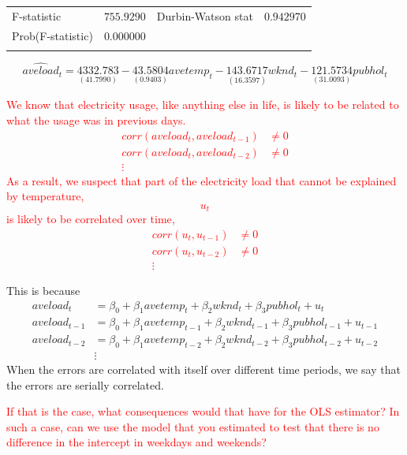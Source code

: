 \documentclass[12pt]{report}
\begin{document}
\begin{table}[H]
\begin{tabular}{lrrrr}
		\multicolumn{1}{l}{F-statistic}&\multicolumn{1}{r}{$755.9290$}&\multicolumn{2}{l}{Durbin-Watson stat}&\multicolumn{1}{r}{$0.942970$}\\
		\multicolumn{1}{l}{Prob(F-statistic)}&\multicolumn{1}{r}{$0.000000$}&\multicolumn{1}{c}{}&\multicolumn{1}{c}{}&\multicolumn{1}{c}{}\\
		[4.5pt] \hline \\ [-4.5pt]
	\end{tabular}
	$$\widehat{aveload}_t = \underset{(41.7990)}{4332.783} - \underset{(0.9403)}{43.5804}avetemp_t - \underset{(16.3597)}{143.6717}wknd_t - \underset{(31.0093)}{121.5734}pubhol_t$$
\end{table}

\noindent \textcolor{red}{We know that electricity usage, like anything else in life, is likely to be related to what the usage was in previous days. 
	\begin{align*}
	corr(aveload_t, aveload_{t-1}) &\neq 0 \\
	corr(aveload_t, aveload_{t-2}) &\neq 0 \\
	\vdots  
	\end{align*}
	As a result, we suspect that part of the electricity load that cannot be explained by temperature, $$u_t$$ is likely to be correlated over time,
	\begin{align*}
	corr(u_t, u_{t-1}) &\neq 0 \\
	corr(u_t, u_{t-2}) &\neq 0 \\
	\vdots 
	\end{align*}} \vspace{-\baselineskip}

\noindent This is because
\begin{align*}
	aveload_t &= \beta_0 + \beta_1 avetemp_t + \beta_2wknd_t + \beta_3pubhol_t + u_t \\
	aveload_{t-1} &= \beta_0 + \beta_1 avetemp_{t-1} + \beta_2wknd_{t-1} + \beta_3pubhol_{t-1} + u_{t-1} \\
	aveload_{t-2} &= \beta_0 + \beta_1 avetemp_{t-2} + \beta_2wknd_{t-2} + \beta_3pubhol_{t-2} + u_{t-2} \\
	&\vdots
\end{align*} \noindent When the errors are correlated with itself over different time periods, we say that the errors are serially correlated.

\noindent \textcolor{red}{If that is the case, what consequences would that have for the OLS estimator? In such a case, can we use the model that you estimated to test that there is no difference in the intercept in weekdays and weekends?}
\end{document}
